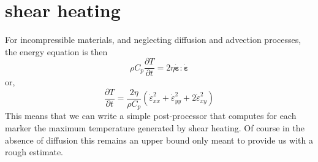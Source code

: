 \documentclass[a4paper]{article}
\begin{document}
\section{shear heating}

For incompressible materials, and neglecting diffusion and advection processes, the energy equation is then
\[
\rho C_p \frac{\partial T}{\partial t} = 2 \eta \dot{\bm \varepsilon}:\dot{\bm \varepsilon}
\]
or, 
\[
\frac{\partial T}{\partial t} = \frac{2 \eta}{\rho C_p} (\dot{\varepsilon}_{xx}^2 + \dot{\varepsilon}_{yy}^2 + 2\dot{\varepsilon}_{xy}^2 ) 
\]
This means that we can write a simple post-processor that computes for each marker the maximum temperature
generated by shear heating. Of course in the absence of diffusion this remains an upper bound only meant 
to provide us with a rough estimate.


\newpage
\printbibliography
\end{document}
